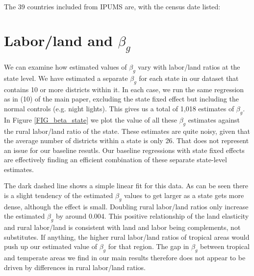 \documentclass[11pt]{article}
\begin{document}
The 39 countries included from IPUMS are, with the census date listed: 
 

\section{Labor/land and $\beta_g$}
We can examine how estimated values of $\beta_g$ vary with labor/land ratios at the state level. We have estimated a separate $\beta_g$ for each state in our dataset that contains 10 or more districts within it. In each case, we run the same regression as in (10) of the main paper, excluding the state fixed effect but including the normal controls (e.g. night lights). This gives us a total of 1,018 estimates of $\beta_g$. In Figure \ref{FIG_beta_state} we plot the value of all these $\beta_g$ estimates against the rural labor/land ratio of the state. These estimates are quite noisy, given that the average number of districts within a state is only 26. That does not represent an issue for our baseline resutls. Our baseline regressions with state fixed effects are effectively finding an efficient combination of these separate state-level estimates. 

The dark dashed line shows a simple linear fit for this data. As can be seen there is a slight tendency of the estimated $\beta_g$ values to get larger as a state gets more dense, although the effect is small. Doubling rural labor/land ratios only increase the estimated $\beta_g$ by around 0.004. This positive relationship of the land elasticity and rural labor/land is consistent with land and labor being complements, not substitutes. If anything, the higher rural labor/land ratios of tropical areas would push up our estimated value of $\beta_g$ for that region. The gap in $\beta_g$ between tropical and temperate areas we find in our main results therefore does not appear to be driven by differences in rural labor/land ratios. 
\end{document}

